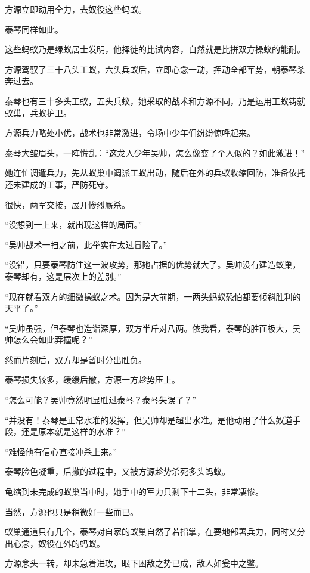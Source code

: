 
\begin{this_body}

方源立即动用全力，去奴役这些蚂蚁。

泰琴同样如此。

这些蚂蚁乃是绿蚁居士发明，他择徒的比试内容，自然就是比拼双方操蚁的能耐。

方源驾驭了三十八头工蚁，六头兵蚁后，立即心念一动，挥动全部军势，朝泰琴杀奔过去。

泰琴也有三十多头工蚁，五头兵蚁，她采取的战术和方源不同，乃是运用工蚁铸就蚁巢，兵蚁护卫。

方源兵力略处小优，战术也非常激进，令场中少年们纷纷惊呼起来。

泰琴大皱眉头，一阵慌乱：“这龙人少年吴帅，怎么像变了个人似的？如此激进！”

她连忙调遣兵力，先从蚁巢中调派工蚁出动，随后在外的兵蚁收缩回防，准备依托还未建成的工事，严防死守。

很快，两军交接，展开惨烈厮杀。

“没想到一上来，就出现这样的局面。”

“吴帅战术一扫之前，此举实在太过冒险了。”

“没错，只要泰琴防住这一波攻势，那她占据的优势就大了。吴帅没有建造蚁巢，泰琴却有，这是层次上的差别。”

“现在就看双方的细微操蚁之术。因为是大前期，一两头蚂蚁恐怕都要倾斜胜利的天平了。”

“吴帅虽强，但泰琴也造诣深厚，双方半斤对八两。依我看，泰琴的胜面极大，吴帅怎么会如此莽撞呢？”

然而片刻后，双方却是暂时分出胜负。

泰琴损失较多，缓缓后撤，方源一方趁势压上。

“怎么可能？吴帅竟然明显胜过泰琴？泰琴失误了？”

“并没有！泰琴是正常水准的发挥，但吴帅却是超出水准。是他动用了什么奴道手段，还是原本就是这样的水准？”

“难怪他有信心直接冲杀上来。”

泰琴脸色凝重，后撤的过程中，又被方源趁势杀死多头蚂蚁。

龟缩到未完成的蚁巢当中时，她手中的军力只剩下十二头，非常凄惨。

当然，方源也只是稍微好一些而已。

蚁巢通道只有几个，泰琴对自家的蚁巢自然了若指掌，在要地部署兵力，同时又分出心念，奴役在外的蚂蚁。

方源念头一转，却未急着进攻，眼下困敌之势已成，敌人如瓮中之鳖。


\end{this_body}
